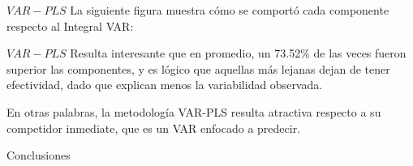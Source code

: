 \documentclass{beamer}
\newcommand{\?}{?`}
\begin{document}
\begin{frame}{$VAR-PLS$}
  La siguiente figura muestra c\'omo se comport\'o cada componente
  respecto al Integral VAR:

  \begin{figure}[htbp]
  \end{figure}
\end{frame}

\begin{frame}{$VAR-PLS$}
  Resulta interesante que en promedio, un 73.52\% de las veces
  fueron superior las componentes, y es l\'ogico que aquellas m\'as
  lejanas dejan de tener efectividad, dado que explican menos la
  variabilidad observada.
  \bigskip

  En otras palabras, la metodolog\'ia VAR-PLS resulta atractiva
  respecto a su competidor inmediate, que es un VAR enfocado a
  predecir.
 
\end{frame}

\begin{frame}{}
  \begin{block}{}
    \begin{center}
      \vspace{3mm}
      {\Large Conclusiones}
      \vspace{3mm}
    \end{center}
  \end{block}
\end{frame}
\end{document}
